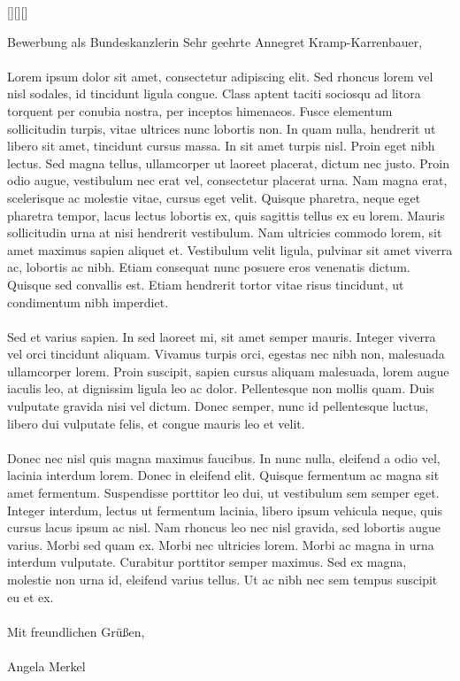 \documentclass[12pt,a4paper]{cvgen}
\begin{document}
[][][]
\begin{letter}{Bewerbung als Bundeskanzlerin}
Sehr geehrte Annegret Kramp-Karrenbauer,\\~\\
Lorem ipsum dolor sit amet, consectetur adipiscing elit. Sed rhoncus lorem vel nisl sodales, id tincidunt ligula congue. Class aptent taciti sociosqu ad litora torquent per conubia nostra, per inceptos himenaeos. Fusce elementum sollicitudin turpis, vitae ultrices nunc lobortis non. In quam nulla, hendrerit ut libero sit amet, tincidunt cursus massa. In sit amet turpis nisl. Proin eget nibh lectus. Sed magna tellus, ullamcorper ut laoreet placerat, dictum nec justo. Proin odio augue, vestibulum nec erat vel, consectetur placerat urna. Nam magna erat, scelerisque ac molestie vitae, cursus eget velit. Quisque pharetra, neque eget pharetra tempor, lacus lectus lobortis ex, quis sagittis tellus ex eu lorem. Mauris sollicitudin urna at nisi hendrerit vestibulum. Nam ultricies commodo lorem, sit amet maximus sapien aliquet et. Vestibulum velit ligula, pulvinar sit amet viverra ac, lobortis ac nibh. Etiam consequat nunc posuere eros venenatis dictum. Quisque sed convallis est. Etiam hendrerit tortor vitae risus tincidunt, ut condimentum nibh imperdiet.\\~\\
Sed et varius sapien. In sed laoreet mi, sit amet semper mauris. Integer viverra vel orci tincidunt aliquam. Vivamus turpis orci, egestas nec nibh non, malesuada ullamcorper lorem. Proin suscipit, sapien cursus aliquam malesuada, lorem augue iaculis leo, at dignissim ligula leo ac dolor. Pellentesque non mollis quam. Duis vulputate gravida nisi vel dictum. Donec semper, nunc id pellentesque luctus, libero dui vulputate felis, et congue mauris leo et velit.\\~\\
Donec nec nisl quis magna maximus faucibus. In nunc nulla, eleifend a odio vel, lacinia interdum lorem. Donec in eleifend elit. Quisque fermentum ac magna sit amet fermentum. Suspendisse porttitor leo dui, ut vestibulum sem semper eget. Integer interdum, lectus ut fermentum lacinia, libero ipsum vehicula neque, quis cursus lacus ipsum ac nisl. Nam rhoncus leo nec nisl gravida, sed lobortis augue varius. Morbi sed quam ex. Morbi nec ultricies lorem. Morbi ac magna in urna interdum vulputate. Curabitur porttitor semper maximus. Sed ex magna, molestie non urna id, eleifend varius tellus. Ut ac nibh nec sem tempus suscipit eu et ex.\\~\\

Mit freundlichen Grüßen,\\~\\

Angela Merkel
\end{letter}
\end{document}
